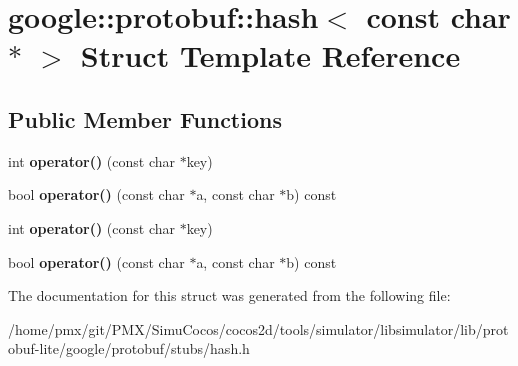 \hypertarget{structgoogle_1_1protobuf_1_1hash_3_01const_01char_01_5_01_4}{}\section{google\+:\+:protobuf\+:\+:hash$<$ const char $\ast$ $>$ Struct Template Reference}
\label{structgoogle_1_1protobuf_1_1hash_3_01const_01char_01_5_01_4}
\subsection*{Public Member Functions}
\begin{DoxyCompactItemize}
\item 
\mbox{\label{structgoogle_1_1protobuf_1_1hash_3_01const_01char_01_5_01_4_a47cb6f85eddc61dca6cfba620dbe5145}} 
int {\bfseries operator()} (const char $\ast$key)
\item 
\mbox{\label{structgoogle_1_1protobuf_1_1hash_3_01const_01char_01_5_01_4_a357189d56e2a4c0a95930cd8648b4d87}} 
bool {\bfseries operator()} (const char $\ast$a, const char $\ast$b) const
\item 
\mbox{\label{structgoogle_1_1protobuf_1_1hash_3_01const_01char_01_5_01_4_a47cb6f85eddc61dca6cfba620dbe5145}} 
int {\bfseries operator()} (const char $\ast$key)
\item 
\mbox{\label{structgoogle_1_1protobuf_1_1hash_3_01const_01char_01_5_01_4_a357189d56e2a4c0a95930cd8648b4d87}} 
bool {\bfseries operator()} (const char $\ast$a, const char $\ast$b) const
\end{DoxyCompactItemize}


The documentation for this struct was generated from the following file\+:\begin{DoxyCompactItemize}
\item 
/home/pmx/git/\+P\+M\+X/\+Simu\+Cocos/cocos2d/tools/simulator/libsimulator/lib/protobuf-\/lite/google/protobuf/stubs/hash.\+h\end{DoxyCompactItemize}
